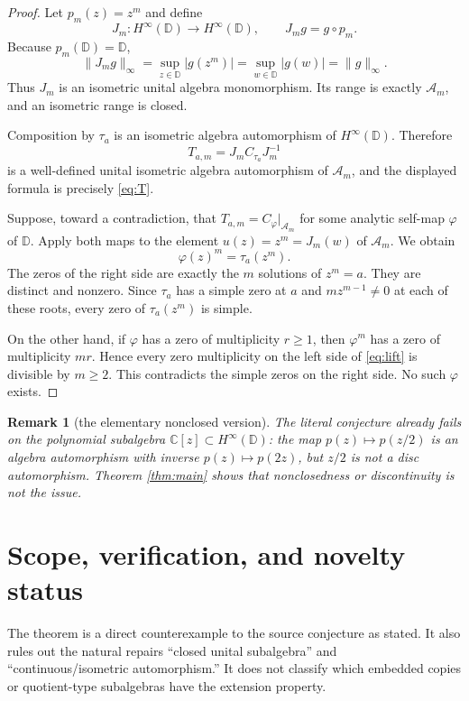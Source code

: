 \documentclass[11pt]{article}
\newtheorem{remark}[theorem]{Remark}
\newcommand{\D}{\mathbb D}
\newcommand{\A}{\mathcal A}
\newcommand{\Hinfty}{H^\infty}
\begin{document}
\begin{proof}
Let $p_m(z)=z^m$ and define
\[
 J_m:\Hinfty(\D)\longrightarrow\Hinfty(\D),\qquad J_mg=g\circ p_m.
\]
Because $p_m(\D)=\D$,
\[
 \|J_mg\|_\infty
 =\sup_{z\in\D}|g(z^m)|
 =\sup_{w\in\D}|g(w)|
 =\|g\|_\infty.
\]
Thus $J_m$ is an isometric unital algebra monomorphism.  Its range is exactly
$\A_m$, and an isometric range is closed.

Composition by $\tau_a$ is an isometric algebra automorphism of
$\Hinfty(\D)$.  Therefore
\[
 T_{a,m}=J_m C_{\tau_a}J_m^{-1}
\]
is a well-defined unital isometric algebra automorphism of $\A_m$, and the
displayed formula is precisely \eqref{eq:T}.

Suppose, toward a contradiction, that $T_{a,m}=C_\varphi|_{\A_m}$ for some
analytic self-map $\varphi$ of $\D$.  Apply both maps to the element
$u(z)=z^m=J_m(w)$ of $\A_m$.  We obtain
\begin{equation}\label{eq:lift}
 \varphi(z)^m=\tau_a(z^m).
\end{equation}
The zeros of the right side are exactly the $m$ solutions of $z^m=a$.
They are distinct and nonzero.  Since $\tau_a$ has a simple zero at $a$ and
$m z^{m-1}\ne0$ at each of these roots, every zero of
$\tau_a(z^m)$ is simple.

On the other hand, if $\varphi$ has a zero of multiplicity $r\ge1$, then
$\varphi^m$ has a zero of multiplicity $mr$.  Hence every zero multiplicity
on the left side of \eqref{eq:lift} is divisible by $m\ge2$.  This contradicts
the simple zeros on the right side.  No such $\varphi$ exists.
\end{proof}

\begin{remark}[the elementary nonclosed version]
The literal conjecture already fails on the polynomial subalgebra
$\mathbb C[z]\subset\Hinfty(\D)$: the map $p(z)\mapsto p(z/2)$ is an algebra
automorphism with inverse $p(z)\mapsto p(2z)$, but $z/2$ is not a disc
automorphism.  Theorem \ref{thm:main} shows that nonclosedness or discontinuity
is not the issue.
\end{remark}

\section*{Scope, verification, and novelty status}

The theorem is a direct counterexample to the source conjecture as stated.
It also rules out the natural repairs ``closed unital subalgebra'' and
``continuous/isometric automorphism.''  It does not classify which embedded
copies or quotient-type subalgebras have the extension property.
\end{document}

